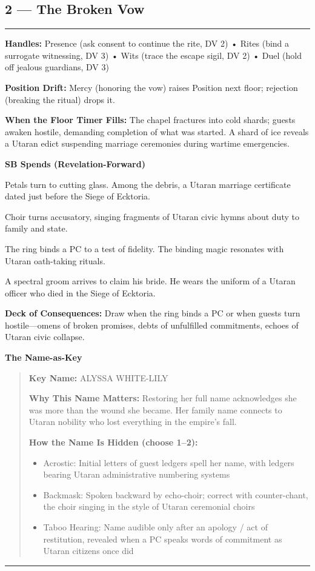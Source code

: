 \documentclass[18pt, letterpaper, twoside]{article}
\newenvironment{floorbox}[1]{%
    \begin{center}
    \begin{minipage}{0.95\textwidth}
    \subsection*{#1}
    \vspace{-0.5em}
    \rule{\textwidth}{0.5pt}
    \vspace{0.5em}
}{%
    \vspace{0.5em}
    \rule{\textwidth}{0.5pt}
    \end{minipage}
    \end{center}
}
\newenvironment{gmnote}[1]{%
    \vspace{0.5em}
    \noindent\textbf{#1}
    \begin{quote}
}{%
    \end{quote}
    \vspace{0.5em}
}
\newcommand{\handles}[1]{\noindent\textbf{Handles:} #1\par}
\newcommand{\sbitem}[2]{\item[#1 SB:] #2}
\newcommand{\deckdraw}[1]{\noindent\textbf{Deck of Consequences:} #1\par}
\newcommand{\keyname}[1]{\noindent\textbf{Key Name:} #1\par}
\newcommand{\nameimportance}[1]{\noindent\textbf{Why This Name Matters:} #1\par}
\begin{document}
\begin{floorbox}{2 --- The Broken Vow}
\handles{Presence (ask consent to continue the rite, DV 2) • Rites (bind a surrogate witnessing, DV 3) • Wits (trace the escape sigil, DV 2) • Duel (hold off jealous guardians, DV 3)}

\textbf{Position Drift:} Mercy (honoring the vow) raises Position next floor; rejection (breaking the ritual) drops it.

\textbf{When the Floor Timer Fills:} The chapel fractures into cold shards; guests awaken hostile, demanding completion of what was started. A shard of ice reveals a Utaran edict suspending marriage ceremonies during wartime emergencies.

\textbf{SB Spends (Revelation-Forward)}
\begin{description}[leftmargin=*, style=unboxed]
    \sbitem{1}{Petals turn to cutting glass. Among the debris, a Utaran marriage certificate dated just before the Siege of Ecktoria.}
    \sbitem{2}{Choir turns accusatory, singing fragments of Utaran civic hymns about duty to family and state.}
    \sbitem{3}{The ring binds a PC to a test of fidelity. The binding magic resonates with Utaran oath-taking rituals.}
    \sbitem{4+}{A spectral groom arrives to claim his bride. He wears the uniform of a Utaran officer who died in the Siege of Ecktoria.}
\end{description}

\deckdraw{Draw when the ring binds a PC or when guests turn hostile---omens of broken promises, debts of unfulfilled commitments, echoes of Utaran civic collapse.}

\begin{gmnote}{The Name-as-Key}
\keyname{ALYSSA WHITE-LILY}
\nameimportance{Restoring her full name acknowledges she was more than the wound she became. Her family name connects to Utaran nobility who lost everything in the empire's fall.}

\textbf{How the Name Is Hidden (choose 1--2):}
\begin{itemize}[leftmargin=*]
    \item Acrostic: Initial letters of guest ledgers spell her name, with ledgers bearing Utaran administrative numbering systems
    \item Backmask: Spoken backward by echo-choir; correct with counter-chant, the choir singing in the style of Utaran ceremonial choirs
    \item Taboo Hearing: Name audible only after an apology / act of restitution, revealed when a PC speaks words of commitment as Utaran citizens once did
\end{itemize}


\end{gmnote}
\end{floorbox}
\end{document}

